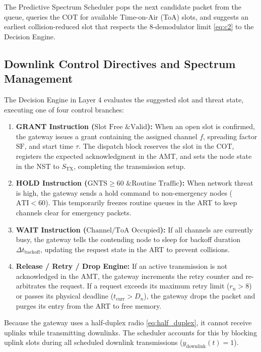 \documentclass[preprint,review,12pt]{elsarticle}
\begin{document}
The Predictive Spectrum Scheduler pops the next candidate packet from the queue, queries the COT for available Time-on-Air (ToA) slots, and suggests an earliest collision-reduced slot that respects the 8-demodulator limit \eqref{eq:c2} to the Decision Engine.

\subsection{Downlink Control Directives and Spectrum Management}

The Decision Engine in Layer 4 evaluates the suggested slot and threat state, executing one of four control branches:

\begin{enumerate}

    \item \textbf{GRANT Instruction ($\text{Slot Free \& Valid}$):} When an open slot is confirmed, the gateway issues a grant containing the assigned channel $f$, spreading factor $\text{SF}$, and start time $\tau$. The dispatch block reserves the slot in the COT, registers the expected acknowledgment in the AMT, and sets the node state in the NST to $S_{\text{TX}}$, completing the transmission setup.

    \item \textbf{HOLD Instruction ($\text{GNTS} \ge 60\text{ \& Routine Traffic}$):} When network threat is high, the gateway sends a hold command to non-emergency nodes ($\text{ATI} < 60$). This temporarily freezes routine queues in the ART to keep channels clear for emergency packets.

    \item \textbf{WAIT Instruction ($\text{Channel/ToA Occupied}$):} If all channels are currently busy, the gateway tells the contending node to sleep for backoff duration $\Delta t_{\text{backoff}}$, updating the request state in the ART to prevent collisions.

    \item \textbf{Release / Retry / Drop Engine:} If an active transmission is not acknowledged in the AMT, the gateway increments the retry counter and re-arbitrates the request. If a request exceeds its maximum retry limit ($r_n > 8$) or passes its physical deadline ($t_{\text{curr}} > D_n$), the gateway drops the packet and purges its entry from the ART to free memory.

\end{enumerate}

Because the gateway uses a half-duplex radio \eqref{eq:half_duplex}, it cannot receive uplinks while transmitting downlinks. The scheduler accounts for this by blocking uplink slots during all scheduled downlink transmissions ($y_{\text{downlink}}(t) = 1$).
\end{document}
